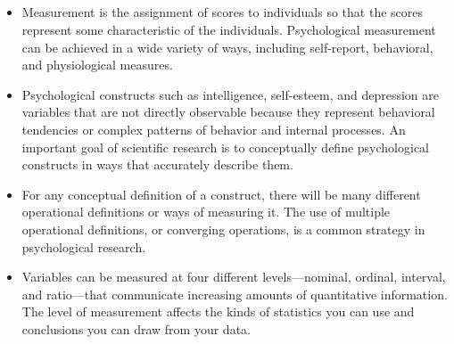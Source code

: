 \subsection{}
\begin{fullwidth}
\begin{itemize}

\item  Measurement is the assignment of scores to individuals so that the scores represent some characteristic of the individuals. Psychological measurement can be achieved in a wide variety of ways, including self-report, behavioral, and physiological measures.
\item Psychological constructs such as intelligence, self-esteem, and depression are variables that are not directly observable because they represent behavioral tendencies or complex patterns of behavior and internal processes. An important goal of scientific research is to conceptually define psychological constructs in ways that accurately describe them.
\item For any conceptual definition of a construct, there will be many different operational definitions or ways of measuring it. The use of multiple operational definitions, or converging operations, is a common strategy in psychological research.
\item Variables can be measured at four different levels—nominal, ordinal, interval, and ratio—that communicate increasing amounts of quantitative information. The level of measurement affects the kinds of statistics you can use and conclusions you can draw from your data.

\end{itemize}
\end{fullwidth}


